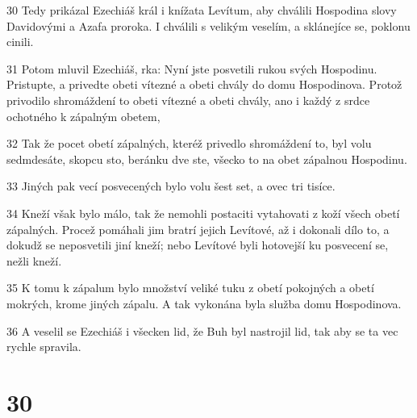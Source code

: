 \par 30 Tedy prikázal Ezechiáš král i knížata Levítum, aby chválili Hospodina slovy Davidovými a Azafa proroka. I chválili s velikým veselím, a sklánejíce se, poklonu cinili.
\par 31 Potom mluvil Ezechiáš, rka: Nyní jste posvetili rukou svých Hospodinu. Pristupte, a privedte obeti vítezné a obeti chvály do domu Hospodinova. Protož privodilo shromáždení to obeti vítezné a obeti chvály, ano i každý z srdce ochotného k zápalným obetem,
\par 32 Tak že pocet obetí zápalných, kteréž privedlo shromáždení to, byl volu sedmdesáte, skopcu sto, beránku dve ste, všecko to na obet zápalnou Hospodinu.
\par 33 Jiných pak vecí posvecených bylo volu šest set, a ovec tri tisíce.
\par 34 Kneží však bylo málo, tak že nemohli postaciti vytahovati z koží všech obetí zápalných. Procež pomáhali jim bratrí jejich Levítové, až i dokonali dílo to, a dokudž se neposvetili jiní kneží; nebo Levítové byli hotovejší ku posvecení se, nežli kneží.
\par 35 K tomu k zápalum bylo množství veliké tuku z obetí pokojných a obetí mokrých, krome jiných zápalu. A tak vykonána byla služba domu Hospodinova.
\par 36 A veselil se Ezechiáš i všecken lid, že Buh byl nastrojil lid, tak aby se ta vec rychle spravila.

\chapter{30}

